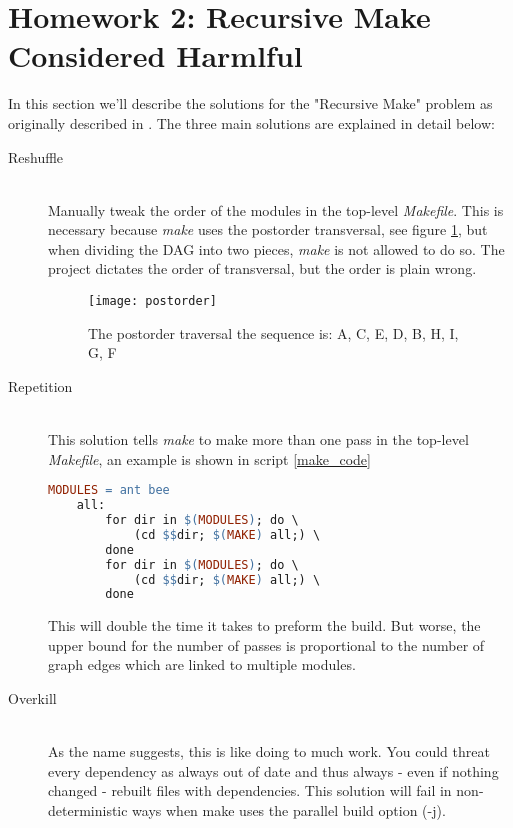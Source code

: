 
\section[Homework 2]{Homework 2: Recursive Make Considered Harmlful}

In this section we'll describe the solutions for the "Recursive Make" problem as originally described in \cite{make_harmful}.
The three main solutions are explained in detail below:
\begin{description}
	  \item[Reshuffle] \hfill \\
	  Manually tweak the order of the modules in the top-level \textit{Makefile}. This is necessary because \textit{make} uses the postorder transversal, see figure \ref{fig:postorder}, but when dividing the DAG into two pieces, \textit{make} is not allowed to do so. The project dictates the order of transversal, but the order is plain wrong.  \hfill \\
	\begin{figure}[H]
		\centering
		\texttt{[image: postorder]}
		\caption{The postorder traversal the sequence is: A, C, E, D, B, H, I, G, F \cite{postorder}}
		\label{fig:postorder}
	\end{figure}
	  \item[Repetition] \hfill \\
	  This solution tells \textit{make} to make more than one pass in the top-level \textit{Makefile}, an example is shown in script \ref{make_code} \hfill \\
	\begin{lstlisting}[frame=single, language=make, caption={An example Makefile using repetition.}, label={make_code}]
	 MODULES = ant bee 
 	all:
    	for dir in $(MODULES); do \
      		(cd $$dir; $(MAKE) all;) \
    	done
    	for dir in $(MODULES); do \
      		(cd $$dir; $(MAKE) all;) \
    	done 
	\end{lstlisting}
	This will double the time it takes to preform the build. But worse, the upper bound for the number of passes is proportional to the number of graph edges which are linked to multiple modules.
	
	  \item[Overkill] \hfill \\
	As the name suggests, this is like doing to much work. You could threat every dependency as always out of date and thus always - even if nothing changed - rebuilt files with dependencies. This solution will fail in non-deterministic ways when make uses the parallel build option (-j).  
	\end{description}